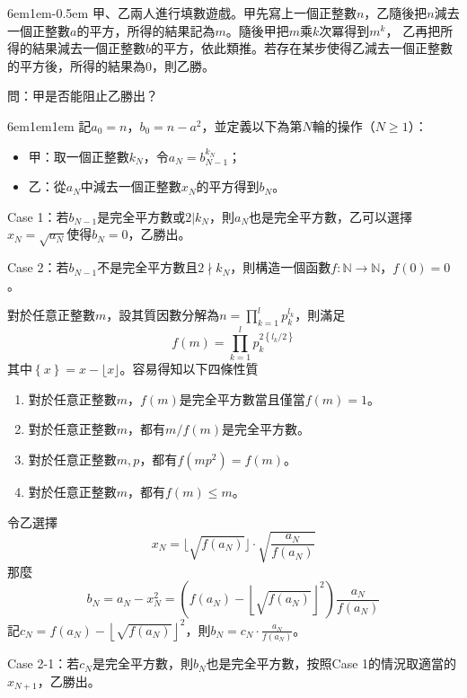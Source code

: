 \documentclass[12pt]{article}
\def\pA{-0.5em}
\def\Ap{1em}
\begin{document}
\begin{mybox}[Problem 6]{6em}{1em}{\pA}
    甲、乙兩人進行填數遊戲。甲先寫上一個正整數$n$，乙隨後把$n$減去一個正整數$a$的平方，所得的結果記為$m$。隨後甲把$m$乘$k$次冪得到$m^k$，
    乙再把所得的結果減去一個正整數$b$的平方，依此類推。若存在某步使得乙減去一個正整數的平方後，所得的結果為0，則乙勝。

    問：甲是否能阻止乙勝出？
\end{mybox}
\begin{mybox}[Answer]{6em}{1em}{\Ap}
    記$a_0=n$，$b_0=n-a^2$，並定義以下為第$N$輪的操作（$N\geq1$）：
    \begin{itemize}
        \item 甲：取一個正整數$k_N$，令$a_N=b_{N-1}^{k_N}$；
        \item 乙：從$a_N$中減去一個正整數$x_N$的平方得到$b_N$。
    \end{itemize}
    Case 1：若$b_{N-1}$是完全平方數或$2|k_N$，則$a_N$也是完全平方數，乙可以選擇$x_N=\sqrt{a_N}$使得$b_N=0$，乙勝出。
    
    Case 2：若$b_{N-1}$不是完全平方數且$2\nmid k_N$，則構造一個函數$f:\mathbb{N}\rightarrow\mathbb{N}$，$f\left(0\right)=0$。
    
    對於任意正整數$m$，設其質因數分解為$n=\prod\limits_{k=1}^{l}{p_k^{l_k}}$，則滿足
    $$
        f\left(m\right)=\prod_{k=1}^{l}{p_k^{2\left\{l_k/2\right\}}}
    $$
    其中$\left\{x\right\}=x-\lfloor x\rfloor$。容易得知以下四條性質
    \begin{enumerate}
        \item 對於任意正整數$m$，$f\left(m\right)$是完全平方數當且僅當$f\left(m\right)=1$。
        \item 對於任意正整數$m$，都有$m/f\left(m\right)$是完全平方數。
        \item 對於任意正整數$m,p$，都有$f\left(mp^2\right)=f\left(m\right)$。
        \item 對於任意正整數$m$，都有$f\left(m\right)\leq m$。
    \end{enumerate}

    令乙選擇
    $$
    x_N=\lfloor\sqrt{f\left(a_N\right)}\rfloor\cdot\sqrt{\frac{a_N}{f\left(a_N\right)}}
    $$
    那麼
    $$
    b_N=a_N - x_N^2 = \left(f\left(a_N\right)-\left\lfloor\sqrt{f\left(a_N\right)}\right\rfloor^2\right)\frac{a_N}{f\left(a_N\right)}
    $$
    記$c_N=f\left(a_N\right)-\left\lfloor\sqrt{f\left(a_N\right)}\right\rfloor^2$，則$b_N=c_N \cdot \frac{a_N}{f\left(a_N\right)}$。

    Case 2-1：若$c_N$是完全平方數，則$b_N$也是完全平方數，按照Case 1的情況取適當的$x_{N+1}$，乙勝出。
    

\end{mybox}
\end{document}
